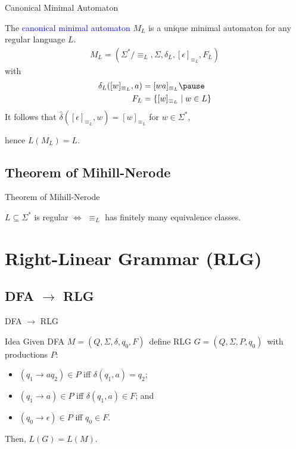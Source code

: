 \documentclass{beamer}
\def\padding{\vspace{0.5cm}}
\def\b{\textcolor{blue}}
\begin{document}
\begin{frame}{Canonical Minimal Automaton}
    \begin{definition}
        The \b{canonical minimal automaton} $M_L$ is a unique minimal automaton for any regular language $L$.\pause
        \begin{align*}
            M_L = (\Sigma^*/{\equiv_L}, \Sigma, \delta_L, [\epsilon]_{\equiv_L}, F_L)
        \end{align*}\pause
        with
        \begin{align*}
            \delta_L([w]_{\equiv_L}, a) &= [wa]_{\equiv_L}\pause \\
            F_L &= \{[w]_{\equiv_L} \mid w \in L\}
        \end{align*}\pause
        It follows that $\hat{\delta}([\epsilon]_{\equiv_L}, w) = [w]_{\equiv_L}$ for $w \in \Sigma^*$,\pause\par
        hence $L(M_L) = L$.
    \end{definition}
\end{frame}

\subsection{Theorem of Mihill-Nerode}

\begin{frame}{Theorem of Mihill-Nerode}
    \begin{theorem}
        $L \subseteq \Sigma^*$ is regular $\iff$ $\equiv_L$ has finitely many equivalence classes.
    \end{theorem}
\end{frame}

\section{Right-Linear Grammar (RLG)}

\subsection{DFA $\to$ RLG}

\begin{frame}{DFA $\to$ RLG}
    \begin{block}{Idea}
        Given DFA $M = (Q, \Sigma, \delta, q_0, F)$\pause\ define RLG $G = (Q, \Sigma, P, q_0)$\pause\ with productions $P$:\pause
        \begin{itemize}
            \item $(q_1 \to a q_2) \in P$ iff $\delta(q_1, a) = q_2$\pause;
            \item $(q_1 \to a) \in P$ iff $\delta(q_1, a) \in F$\pause; and
            \item $(q_0 \to \epsilon) \in P$ iff $q_0 \in F$.
        \end{itemize}\pause\padding
        Then, $L(G) = L(M)$.
    \end{block}
\end{frame}
\end{document}
